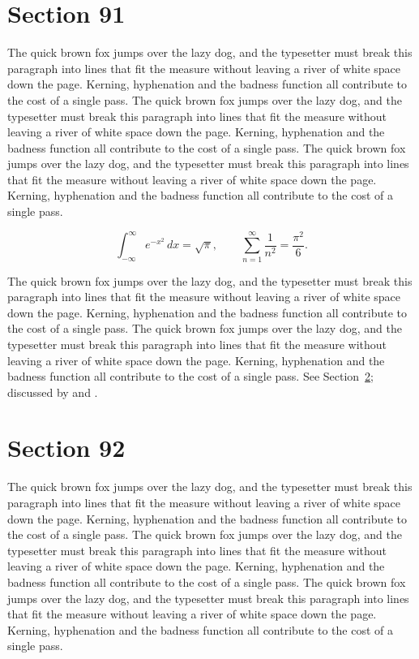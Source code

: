 \documentclass{article}
\begin{document}
\section{Section 91}
\label{sec:91}
The quick brown fox jumps over the lazy dog, and the typesetter must break this paragraph into lines that fit the measure without leaving a river of white space down the page. Kerning, hyphenation and the badness function all contribute to the cost of a single pass. The quick brown fox jumps over the lazy dog, and the typesetter must break this paragraph into lines that fit the measure without leaving a river of white space down the page. Kerning, hyphenation and the badness function all contribute to the cost of a single pass. The quick brown fox jumps over the lazy dog, and the typesetter must break this paragraph into lines that fit the measure without leaving a river of white space down the page. Kerning, hyphenation and the badness function all contribute to the cost of a single pass. 

\begin{equation}\label{eq:91}
\int_{-\infty}^{\infty} e^{-x^{2}}\,dx = \sqrt{\pi}, \qquad
\sum_{n=1}^{\infty} \frac{1}{n^{2}} = \frac{\pi^{2}}{6}.
\end{equation}

The quick brown fox jumps over the lazy dog, and the typesetter must break this paragraph into lines that fit the measure without leaving a river of white space down the page. Kerning, hyphenation and the badness function all contribute to the cost of a single pass. The quick brown fox jumps over the lazy dog, and the typesetter must break this paragraph into lines that fit the measure without leaving a river of white space down the page. Kerning, hyphenation and the badness function all contribute to the cost of a single pass. 
See Section~\ref{sec:92}; discussed by \textcite{k2} and \textcite{l4}.
\section{Section 92}
\label{sec:92}
The quick brown fox jumps over the lazy dog, and the typesetter must break this paragraph into lines that fit the measure without leaving a river of white space down the page. Kerning, hyphenation and the badness function all contribute to the cost of a single pass. The quick brown fox jumps over the lazy dog, and the typesetter must break this paragraph into lines that fit the measure without leaving a river of white space down the page. Kerning, hyphenation and the badness function all contribute to the cost of a single pass. The quick brown fox jumps over the lazy dog, and the typesetter must break this paragraph into lines that fit the measure without leaving a river of white space down the page. Kerning, hyphenation and the badness function all contribute to the cost of a single pass. 
\end{document}
